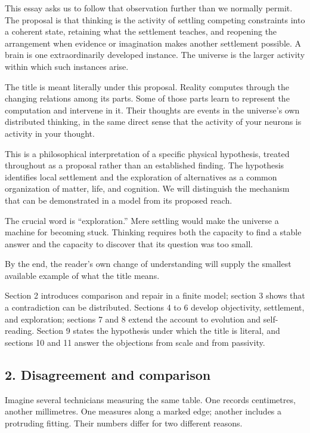 \documentclass[
  11pt,
]{article}
\begin{document}
This essay asks us to follow that observation further than we normally
permit. The proposal is that thinking is the activity of settling
competing constraints into a coherent state, retaining what the
settlement teaches, and reopening the arrangement when evidence or
imagination makes another settlement possible. A brain is one
extraordinarily developed instance. The universe is the larger activity
within which such instances arise.

The title is meant literally under this proposal. Reality computes
through the changing relations among its parts. Some of those parts
learn to represent the computation and intervene in it. Their thoughts
are events in the universe's own distributed thinking, in the same
direct sense that the activity of your neurons is activity in your
thought.

This is a philosophical interpretation of a specific physical
hypothesis, treated throughout as a proposal rather than an established
finding. The hypothesis identifies local settlement and the exploration
of alternatives as a common organization of matter, life, and cognition.
We will distinguish the mechanism that can be demonstrated in a model
from its proposed reach.

The crucial word is ``exploration.'' Mere settling would make the
universe a machine for becoming stuck. Thinking requires both the
capacity to find a stable answer and the capacity to discover that its
question was too small.

By the end, the reader's own change of understanding will supply the
smallest available example of what the title means.

Section 2 introduces comparison and repair in a finite model; section 3
shows that a contradiction can be distributed. Sections 4 to 6 develop
objectivity, settlement, and exploration; sections 7 and 8 extend the
account to evolution and self-reading. Section 9 states the hypothesis
under which the title is literal, and sections 10 and 11 answer the
objections from scale and from passivity.

\subsection{2. Disagreement and
comparison}\label{disagreement-and-comparison}

Imagine several technicians measuring the same table. One records
centimetres, another millimetres. One measures along a marked edge;
another includes a protruding fitting. Their numbers differ for two
different reasons.
\end{document}
